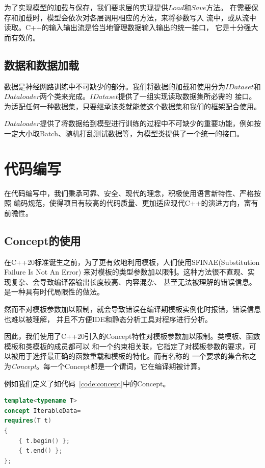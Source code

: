 \documentclass[a4paper,twoside,twocolumn]{article}
\begin{document}
\begin{spacing}{1.2}
为了实现模型的加载与保存，我们要求层的实现提供$Load$和$Save$方法。
在需要保存和加载时，模型会依次对各层调用相应的方法，来将参数写入
流中，或从流中读取。C++的输入输出流是恰当地管理数据输入输出的统一接口，
它是十分强大而有效的。

\subsection{数据和数据加载}

数据是神经网路训练中不可缺少的部分。我们将数据的加载和使用分为$IDataset$和
$Dataloader$两个类来完成。$IDataset$提供了一组实现读取数据集所必需的
接口。为适配任何一种数据集，只要继承该类就能使这个数据集和我们的框架配合使用。

$Dataloader$提供了将数据给到模型进行训练的过程中不可缺少的重要功能，例如按
一定大小取Batch、随机打乱测试数据等，为模型类提供了一个统一的接口。

\section{代码编写}

在代码编写中，我们秉承可靠、安全、现代的理念，积极使用语言新特性、严格按照
编码规范，使得项目有较高的代码质量、更加适应现代C++的演进方向，富有前瞻性。

\subsection{Concept的使用}

在C++20标准诞生之前，为了更有效地利用模板，人们使用SFINAE(Substitution Failure Is Not An Error)
来对模板的类型参数加以限制。这种方法很不直观、实现复杂、会导致编译器输出长度较高、内容混杂、
甚至无法被理解的错误信息。是一种具有时代局限性的做法。

然而不对模板参数加以限制，就会导致错误在编译期模板实例化时报错，错误信息也难以被理解，
并且不方便IDE和静态分析工具对程序进行分析。

因此，我们使用了C++20引入的Concept特性对模板参数加以限制。类模板、函数模板和类模板的成员都可以
和一个约束相关联，它指定了对模板参数的要求，可以被用于选择最正确的函数重载和模板的特化。而有名称的
一个要求的集合称之为\emph{Concept}。每一个Concept都是一个谓词，它在编译期被计算。

例如我们定义了如代码~\ref{code:concept}中的Concept。
\begin{lstlisting}[language=c++,style=CppStyle,caption={Concept},label={code:concept}]
template<typename T>
concept IterableData=
requires(T t)
{
    { t.begin() };
    { t.end() };
};


\end{lstlisting}
\end{spacing}
\end{document}
